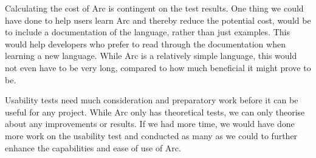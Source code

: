 Calculating the cost of Arc is contingent on the test results. One thing we could have done to help users learn Arc and thereby reduce the potential cost, would be to include a documentation of the language, rather than just examples. This would help developers who prefer to read through the documentation when learning a new language. While Arc is a relatively simple language, this would not even have to be very long, compared to how much beneficial it might prove to be.

Usability tests need much consideration and preparatory work before it can be useful for any project. While Arc only has theoretical tests, we can only theorise about any improvements or results. If we had more time, we would have done more work on the usability test and conducted as many as we could to further enhance the capabilities and ease of use of Arc.